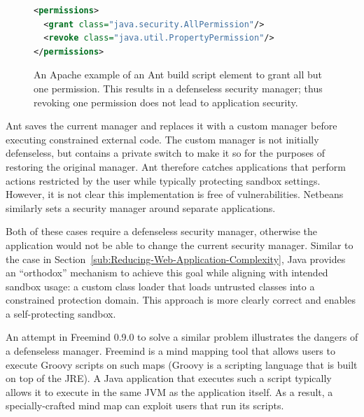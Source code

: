 \documentclass{sig-alternate}
\begin{document}
\begin{figure}
\begin{lstlisting}[language=XML,basicstyle={\scriptsize}]
<permissions>   
  <grant class="java.security.AllPermission"/>   
  <revoke class="java.util.PropertyPermission"/> 
</permissions>
\end{lstlisting}

\caption{An Apache example of an Ant build script element to grant all but
  one permission. This results in a defenseless security manager;
\label{fig:Ant Permissions Example} 
  thus revoking one permission does not lead to application security.}
\end{figure}

Ant saves the current manager and replaces it with a custom manager before
executing constrained external code.  The custom
manager is not initially defenseless, but
contains a private switch to make it so for the purposes of
restoring the original manager.  Ant therefore catches 
applications that perform actions restricted by the user while typically
protecting sandbox settings. However, it is not clear this implementation is
free of vulnerabilities. Netbeans similarly sets a security manager around 
separate applications.

Both of these cases require a defenseless security manager, otherwise
the application would not be able to change the current security manager. 
Similar to the case in Section~\ref{sub:Reducing-Web-Application-Complexity},
Java provides an ``orthodox'' mechanism to achieve this goal while aligning with
intended sandbox usage: a custom class
loader that loads untrusted classes into a constrained protection
domain.  %
This approach is more clearly correct and enables a self-protecting sandbox.

An attempt in Freemind 0.9.0 to solve a similar problem illustrates
the dangers of a defenseless manager. Freemind is a mind mapping tool that
allows users to execute
Groovy scripts on such maps (Groovy is a scripting
language that is built on top of the JRE).  A Java application that
executes such a script typically allows it to execute in the same
JVM as the application itself. As a result, a specially-crafted mind map can
exploit users that run its scripts.
\end{document}
